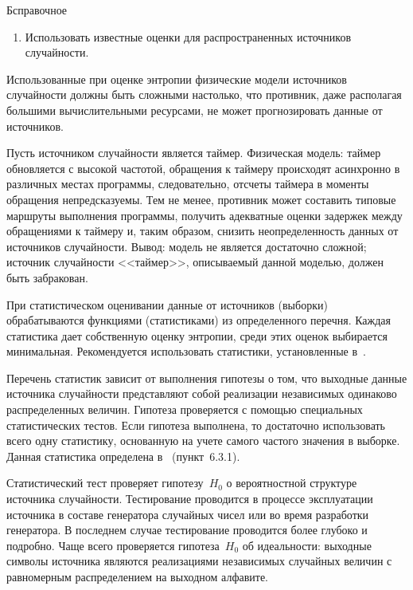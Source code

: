 \begin{appendix}{Б}{справочное}
\begin{enumerate}
\begin{example*}
В проведенных экспериментах величина $h^*$ была не меньше $27,1$.
%
Нижняя граница достигалась для процессоров 
с минимально допустимой тактовой частотой $600$~МГц.
\end{example*}

\item 
Использовать известные оценки для распространенных источников случайности.
\end{enumerate}

Использованные при оценке энтропии физические модели источников случайности 
должны быть сложными настолько, что противник, даже располагая большими 
вычислительными ресурсами, не может прогнозировать данные от источников. 

\begin{example}
Пусть источником случайности является таймер. 
Физическая модель: таймер обновляется с высокой частотой, обращения к 
таймеру происходят асинхронно в различных местах программы, 
следовательно, отсчеты таймера в моменты обращения непредсказуемы. 
Тем не менее, противник может составить типовые маршруты выполнения 
программы, получить адекватные оценки задержек между обращениями к 
таймеру и, таким образом, снизить неопределенность данных от 
источников случайности. Вывод: модель не является достаточно сложной; 
источник случайности <<таймер>>, описываемый данной моделью, должен быть 
забракован.
\end{example}

При статистическом оценивании данные от источников (выборки)
обрабатываются функциями (статистиками) из определенного перечня. 
Каждая статистика дает собственную оценку энтропии, среди этих оценок 
выбирается минимальная. Рекомендуется использовать статистики, установленные 
в~\cite{SP800-90B}.  

Перечень статистик зависит от выполнения гипотезы о том, что выходные 
данные источника случайности представляют собой реализации 
независимых одинаково распределенных величин. Гипотеза проверяется 
с помощью специальных статистических тестов.
%
Если гипотеза выполнена, то достаточно использовать всего одну статистику,
основанную на учете самого частого значения в выборке. Данная статистика определена 
в~\cite{SP800-90B} (пункт~6.3.1).

\label{RNG.StatTest}

Статистический тест проверяет гипотезу~$H_0$ о вероятностной структуре 
источника случайности.
%
Тестирование проводится в процессе эксплуатации источника в составе 
генератора случайных чисел или во время разработки генератора.
%
В последнем случае тестирование проводится более глубоко и подробно. 
%
Чаще всего проверяется гипотеза~$H_0$ об идеальности:
выходные символы источника являются реализациями независимых случайных величин  
с равномерным распределением на выходном алфавите.


\end{appendix}
